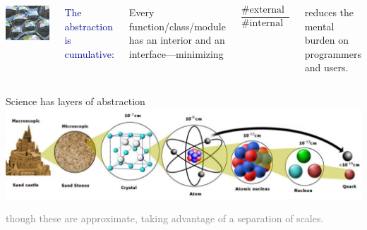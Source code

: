 \documentclass[aspectratio=169]{beamer}
\begin{document}
\begin{frame}{}
\Large
\vspace{0.97 cm}
\begin{columns}
\mbox{\hspace{-3.5 cm}\includegraphics[height=8 cm]{soap-bubbles.jpg}}

\textcolor{darkblue}{The abstraction is cumulative:}

\vspace{0.25 cm}
Every function/class/module has an interior and an interface---minimizing

\[ \frac{\mbox{\#external parameters}}{\mbox{\#internal parameters}} \]

\vspace{0.25 cm}
reduces the mental burden on programmers and users.
\end{columns}
\end{frame}

\begin{frame}{Science has layers of abstraction}
\large
\vspace{0.75 cm}
\includegraphics[width=\linewidth]{atom-proton-quark.png}

\vspace{1 cm}
\textcolor{gray}{though these are approximate, taking advantage of a separation of scales.}
\end{frame}
\end{document}
